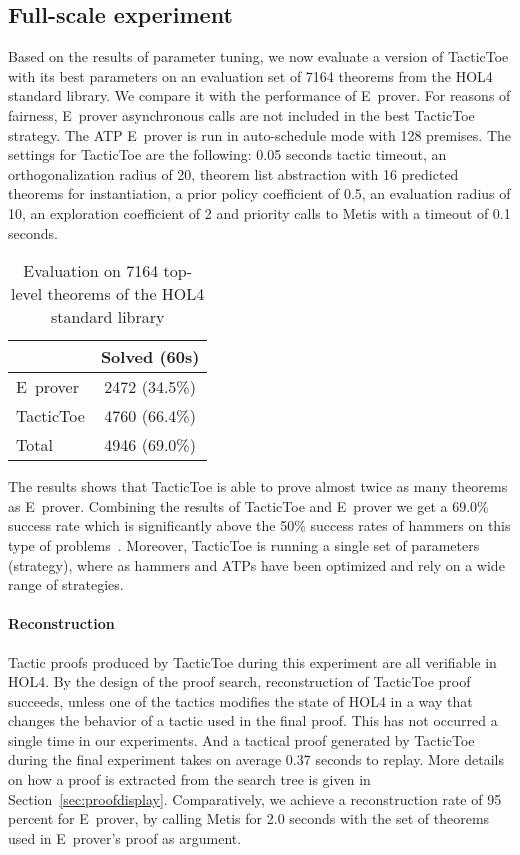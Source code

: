 \documentclass[runningheads,a4paper,draft]{svjour3}
\def\holfour{\textsf{HOL4}\xspace}
\def\eprover{\textsf{E~prover}\xspace}
\def\metis{\textsf{Metis}\xspace}
\def\tactictoe{\textsf{TacticToe}\xspace}
\newcommand{\ra}[1]{\renewcommand{\arraystretch}{#1}}
\begin{document}
\subsection{Full-scale experiment}\label{sec:full_exp}

Based on the results of parameter tuning, we now evaluate a version of
\tactictoe with its best parameters on an evaluation set of 7164 theorems from
the \holfour standard library. We compare it with the performance of \eprover.
For reasons of fairness, \eprover asynchronous calls are not included in the
best \tactictoe strategy. The ATP \eprover is run in auto-schedule mode with
128 premises. The settings for \tactictoe are the following:
0.05 seconds tactic timeout, an orthogonalization radius of 20, theorem list
abstraction with 16 predicted theorems for instantiation, a prior policy
coefficient of 0.5, an evaluation radius of 10, an exploration coefficient of 2
and priority calls to \metis with a timeout of 0.1 seconds.

\begin{table}[h!]
\centering\ra{1.3}
\small
\begin{tabular}{lc}
\toprule
  & Solved (60s) \\
\midrule
   \eprover   & 2472 (34.5\%)\\
   \tactictoe & 4760 (66.4\%)\\
\midrule
   Total  & 4946 (69.0\%)\\
\bottomrule
\end{tabular}
\caption{\label{tab:_param} Evaluation on 7164 top-level theorems of the 
\holfour standard library
}
\end{table}

The results shows that \tactictoe is able to prove almost twice as many
theorems as \eprover. Combining the results of \tactictoe and \eprover we get a
69.0\% success rate which is significantly above the 50\% success rates
of hammers on this type of problems~\cite{tgck-cpp15}. Moreover, \tactictoe is
running a single set of parameters (strategy), where as hammers and ATPs have
been optimized and rely on a wide range of strategies.


\paragraph{Reconstruction}
Tactic proofs produced by \tactictoe during this experiment are all verifiable
in \holfour. By the design of the proof search, reconstruction of \tactictoe
proof succeeds, unless one of the tactics modifies the state of \holfour in a
way that changes the behavior of a tactic used in the final proof. This has not
occurred a single time in our experiments. And a tactical proof generated by 
\tactictoe during the final experiment takes on average 0.37 seconds to replay.
More details on how a proof is extracted from the search tree is given in
Section~\ref{sec:proofdisplay}.
Comparatively, we achieve a reconstruction rate of 95 percent for \eprover,
by calling \metis for 2.0 seconds with the set of theorems used
in \eprover's proof as argument.
\end{document}

